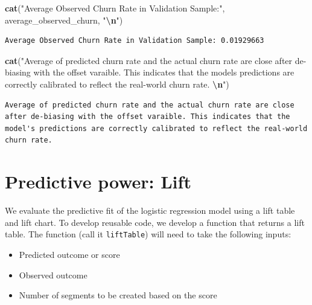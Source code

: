 \documentclass[
]{article}
\newenvironment{Shaded}{\begin{snugshade}}{\end{snugshade}}
\newcommand{\FunctionTok}[1]{\textcolor[rgb]{0.13,0.29,0.53}{\textbf{#1}}}
\newcommand{\NormalTok}[1]{#1}
\newcommand{\SpecialCharTok}[1]{\textcolor[rgb]{0.81,0.36,0.00}{\textbf{#1}}}
\newcommand{\StringTok}[1]{\textcolor[rgb]{0.31,0.60,0.02}{#1}}
\providecommand{\tightlist}{%
  \setlength{\itemsep}{0pt}\setlength{\parskip}{0pt}}
\begin{document}
\begin{Shaded}
\begin{Highlighting}[]
\FunctionTok{cat}\NormalTok{(}\StringTok{"Average Observed Churn Rate in Validation Sample:"}\NormalTok{, average\_observed\_churn, }\StringTok{"}\SpecialCharTok{\textbackslash{}n}\StringTok{"}\NormalTok{)}
\end{Highlighting}
\end{Shaded}

\begin{verbatim}
Average Observed Churn Rate in Validation Sample: 0.01929663 
\end{verbatim}

\begin{Shaded}
\begin{Highlighting}[]
\FunctionTok{cat}\NormalTok{(}\StringTok{"Average of predicted churn rate and the actual churn rate are close after de{-}biasing with the offset varaible. This indicates that the model\textquotesingle{}s predictions are correctly calibrated to reflect the real{-}world churn rate. }\SpecialCharTok{\textbackslash{}n}\StringTok{"}\NormalTok{)}
\end{Highlighting}
\end{Shaded}

\begin{verbatim}
Average of predicted churn rate and the actual churn rate are close after de-biasing with the offset varaible. This indicates that the model's predictions are correctly calibrated to reflect the real-world churn rate. 
\end{verbatim}

\newpage

\section{Predictive power: Lift}\label{predictive-power-lift}

We evaluate the predictive fit of the logistic regression model using a
lift table and lift chart. To develop reusable code, we develop a
function that returns a lift table. The function (call it
\texttt{liftTable}) will need to take the following inputs:

\begin{itemize}
\tightlist
\item
  Predicted outcome or score
\item
  Observed outcome
\item
  Number of segments to be created based on the score
\end{itemize}
\end{document}
